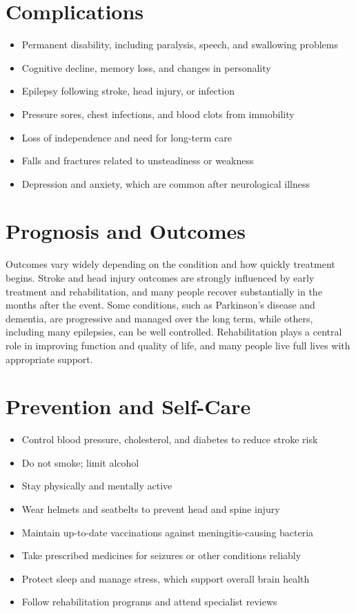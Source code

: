 \section*{Complications}
\begin{itemize}
    \item Permanent disability, including paralysis, speech, and swallowing problems
    \item Cognitive decline, memory loss, and changes in personality
    \item Epilepsy following stroke, head injury, or infection
    \item Pressure sores, chest infections, and blood clots from immobility
    \item Loss of independence and need for long-term care
    \item Falls and fractures related to unsteadiness or weakness
    \item Depression and anxiety, which are common after neurological illness
\end{itemize}

\section*{Prognosis and Outcomes}
Outcomes vary widely depending on the condition and how quickly treatment begins. Stroke and head injury outcomes are strongly influenced by early treatment and rehabilitation, and many people recover substantially in the months after the event. Some conditions, such as Parkinson's disease and dementia, are progressive and managed over the long term, while others, including many epilepsies, can be well controlled. Rehabilitation plays a central role in improving function and quality of life, and many people live full lives with appropriate support.

\section*{Prevention and Self-Care}
\begin{itemize}
    \item Control blood pressure, cholesterol, and diabetes to reduce stroke risk
    \item Do not smoke; limit alcohol
    \item Stay physically and mentally active
    \item Wear helmets and seatbelts to prevent head and spine injury
    \item Maintain up-to-date vaccinations against meningitis-causing bacteria
    \item Take prescribed medicines for seizures or other conditions reliably
    \item Protect sleep and manage stress, which support overall brain health
    \item Follow rehabilitation programs and attend specialist reviews
\end{itemize}

